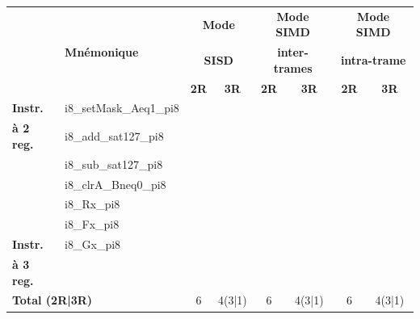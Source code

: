 \documentclass[../main.tex]{subfiles}
\begin{document}
\begin{table}
    \centering
    \footnotesize
    \begin{tabular}{l|l|c|c|c|c|c|c}
        \toprule
        &\multirow{3}{*}{\textbf{Mnémonique}}&\multicolumn{2}{c|}{\textbf{Mode}} & \multicolumn{2}{c|}{\textbf{Mode SIMD}} & \multicolumn{2}{c}{\textbf{Mode SIMD}}\\
        &&\multicolumn{2}{c|}{\textbf{SISD}} & \multicolumn{2}{c|}{\textbf{inter-trames}} & \multicolumn{2}{c}{\textbf{intra-trame}}\\
        &&\textbf{2R}& \textbf{3R}& \textbf{2R} & \textbf{3R} & \textbf{2R} & \textbf{3R}\\
        \cmidrule(l){1-8}

        \textbf{Instr.}  &i8\_setMask\_Aeq1\_pi8	        &       &   &   \checkmark   &    &  \checkmark &     \\ 
        \textbf{à 2 reg.}    &i8\_add\_sat127\_pi8	        &   \checkmark   &   &   \checkmark   &    &  \checkmark &     \\ 	
            &i8\_sub\_sat127\_pi8	        &   \checkmark   &   &   \checkmark   &    &  \checkmark &     \\ 
            &i8\_clrA\_Bneq0\_pi8	        &   \checkmark   & \checkmark &   \checkmark   &  \checkmark &  \checkmark & \checkmark   \\ 		
            &i8\_Rx\_pi8			        &   \checkmark   & \checkmark &   \checkmark   &  \checkmark &  \checkmark & \checkmark   \\ 	
            &i8\_Fx\_pi8			        &   \checkmark   & \checkmark &   \checkmark   &  \checkmark &  \checkmark & \checkmark   \\ 	
        \cmidrule(l){1-8} 		
        \textbf{Instr.}  &i8\_Gx\_pi8				    &       & \checkmark &       &  \checkmark &    & \checkmark   \\
        \textbf{à 3 reg.} & & & & & & &\\
        \cmidrule(l){1-8} 
        \multicolumn{2}{l|}{\textbf{Total (2R|3R)}} &6      &4(3|1)& 6  &4(3|1) &6    &4(3|1) \\ 
        \bottomrule


\end{tabular}
\end{table}
\end{document}
